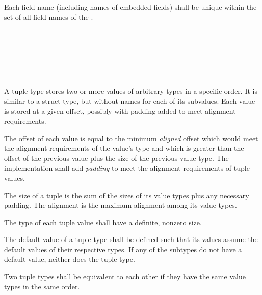 
\specsubsubitem
Each field name (including names of embedded fields) shall be unique within the
set of all field names of the .


\begin{grammar}
 \\
	\terminal{(}  \terminal{)} \\

 \\
	 \terminal{,}  \optional{\terminal{,}}\\
	 \terminal{,}  \\
\end{grammar}

\specsubsubitem
A tuple type stores two or more values of arbitrary types in a specific order.
It is similar to a struct type, but without names for each of its subvalues.
Each value is stored at a given offset, possibly with padding added to meet
alignment requirements.

\specsubsubitem
The offset of each value is equal to the minimum \textit{aligned} offset which
would meet the alignment requirements of the value's type and which is greater
than the offset of the previous value plus the size of the previous value type.
The implementation shall add \textit{padding} to meet the alignment
requirements of tuple values.

\specsubsubitem
The size of a tuple is the sum of the sizes of its value types plus any necessary
padding. The alignment is the maximum alignment among its value types.

\specsubsubitem
The type of each tuple value shall have a definite, nonzero size.

\specsubsubitem
The default value of a tuple type shall be defined such that its values assume
the default values of their respective types. If any of the subtypes do not
have a default value, neither does the tuple type.

\specsubsubitem
Two tuple types shall be equivalent to each other if they have the same value
types in the same order.

